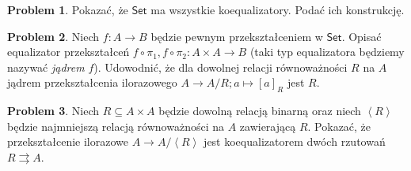 \documentclass[10pt]{amsart}
\theoremstyle{plain}
\theoremstyle{definition}
\newtheorem{problem}{Problem}
\numberwithin{equation}{section}
\begin{document}
\begin{problem}
Pokazać, że $\mathsf{Set}$ ma wszystkie koequalizatory. Podać ich konstrukcję.
\end{problem}
\begin{problem}
Niech $f:A\to B$ będzie pewnym przekształceniem w $\mathsf{Set}$. Opisać equalizator przekształceń $f\circ \pi_1, f\circ \pi_2:A\times A\to B$ (taki typ equalizatora będziemy nazywać \emph{jądrem} $f$). Udowodnić, że dla dowolnej relacji równoważności $R$ na $A$ jądrem  przekształcenia ilorazowego $A\to A/R; a\mapsto [a]_R$ jest $R$.
\end{problem}
\begin{problem}
Niech $R\subseteq A\times A$ będzie dowolną relacją binarną oraz niech $\left < R\right >$ będzie najmniejszą relacją równoważności na $A$ zawierającą $R$. Pokazać, że przekształcenie ilorazowe $A\to A/\left < R \right >$ jest koequalizatorem dwóch rzutowań $R\rightrightarrows A$. 
\end{problem}
\end{document}
